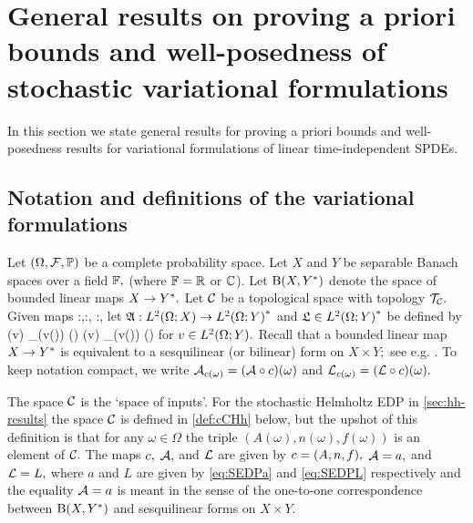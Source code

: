 \section{General results on proving a priori bounds and well-posedness of stochastic variational formulations}\label{sec:gen-framework}\label{sec:general}
In this section we state general results for proving a priori bounds and well-posedness results for variational formulations of linear time-independent SPDEs.

\subsection{Notation and definitions of the variational formulations}\label{sec:notdef}
Let $\OFP$ be a complete probability space. Let $X$ and $Y$ be separable Banach spaces over a field $\mathbb F,$ (where $\mathbb F = \mathbb R$ or $\mathbb C$).
Let $\homspace$ denote the space of bounded linear maps $X\rightarrow Y^{*}.$ Let $\mathcal C$ be a topological space with topology $\mathcal T_{\mathcal C}.$ Given maps
\beqs
\coeff:\Omega\rightarrow\cC,\quad\toform:\cC \rightarrow \homspace,\quad{} \rhs:\cC \rightarrow \Ys,
\eeqs let $\SAc:\LtOX \rightarrow \LtOYas$ and  $\SLc \in \LtOYas$ be defined by
\beq\label{eq:SA}
(v) \de \int_\Omega {}\big(v(\omega)\big) \dd\PP(\omega) \quad{} \quad 
\SLc(v) \de \int_\Omega \Lcomega\big(v(\omega)\big) \dd \PP(\omega)
\eeq
for $v \in \LtOY.$ Recall that a bounded linear map $X\rightarrow Y^{*}$ is equivalent to a sesquilinear (or bilinear) form on $X \times Y;$ see e.g. \cite[Lemma 2.1.38]{SaSc:11}. To keep notation compact, we write $\Acomega=(\toform \circ c)(\omega)$ and $\Lcomega=(\rhs\circ c)(\omega).$



The space $\mathcal C$ is the `space of inputs'. For the stochastic Helmholtz EDP in \cref{sec:hh-results} the space $\mathcal C$ is defined in \cref{def:cCHh} below, but the upshot of this definition is that for any $\omega \in \Omega$ the triple $(A(\omega),n(\omega),f(\omega))$ is an element of $\mathcal C.$
The maps $c,$ $\mathcal A,$ and $\mathcal L$ are given by $\coeff = \mleft(A,n,f\mright),$ $\mathcal A = a,$ and $\mathcal L = L,$ where $a$ and $L$ are given by \eqref{eq:SEDPa} and \eqref{eq:SEDPL} respectively and the equality $\mathcal A=a$ is meant in the sense of the one-to-one correspondence between $\homspace$ and sesquilinear forms on $X\times Y.$
\ere

